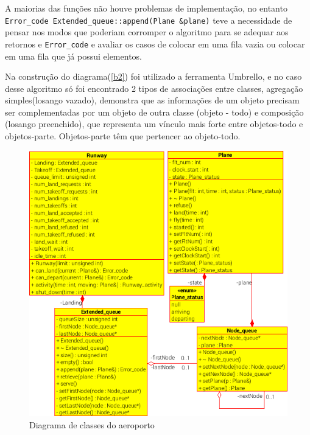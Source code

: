 \documentclass[conference]{IEEEtran}
\begin{document}

A maiorias das funções não houve problemas de implementação, no entanto \texttt{Error\_code Extended\_queue::append(Plane \&plane)} teve a necessidade de pensar nos modos que poderiam corromper o algoritmo para se adequar aos retornos e \texttt{Error\_code} e avaliar os casos de colocar em uma fila vazia ou colocar em uma fila que já possui elementos.

Na construção do diagrama(\autoref{b2}) foi utilizado a ferramenta Umbrello\cite{b4}, e no caso desse algoritmo só foi encontrado 2 tipos de associações entre classes, agregação simples(losango vazado), demonstra que as informações de um objeto precisam ser complementadas por um objeto de outra classe (objeto - todo) e composição (losango preenchido), que representa um vínculo mais forte entre objetos-todo e objetos-parte. Objetos-parte têm que pertencer ao objeto-todo\cite{b5}.

\begin{figure}[htb]
	\caption{\label{b2}Diagrama de classes do aeroporto}
	\begin{center}
	    \includegraphics[scale=0.6]{figs/Parte_1.png}
	\end{center}
\end{figure}
\end{document}
